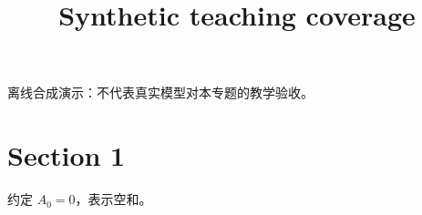 \documentclass[UTF8,fontset=fandol,11pt]{ctexart}
\title{Synthetic teaching coverage}
\date{}
\begin{document}
\maketitle
\par\noindent 离线合成演示：不代表真实模型对本专题的教学验收。\par
\section{Section 1}\label{sec:S01}
约定 $A_0=0$，表示空和。\par
\end{document}
